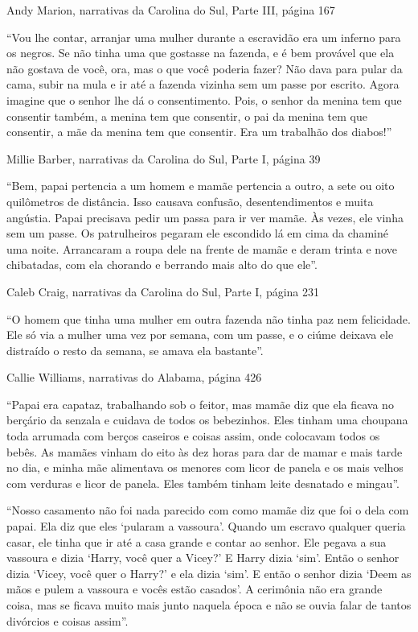 Andy Marion, narrativas da Carolina do Sul, Parte III, página 167

``Vou lhe contar, arranjar uma mulher durante a escravidão era um
inferno para os negros. Se não tinha uma que gostasse na fazenda, e é
bem provável que ela não gostava de você, ora, mas o que você poderia
fazer? Não dava para pular da cama, subir na mula e ir até a fazenda
vizinha sem um passe por escrito. Agora imagine que o senhor lhe dá o
consentimento. Pois, o senhor da menina tem que consentir também, a
menina tem que consentir, o pai da menina tem que consentir, a mãe da
menina tem que consentir. Era um trabalhão dos diabos!''

Millie Barber, narrativas da Carolina do Sul, Parte I, página 39

``Bem, papai pertencia a um homem e mamãe pertencia a outro, a sete ou
oito quilômetros de distância. Isso causava confusão, desentendimentos e
muita angústia. Papai precisava pedir um passa para ir ver mamãe. Às
vezes, ele vinha sem um passe. Os patrulheiros pegaram ele escondido lá
em cima da chaminé uma noite. Arrancaram a roupa dele na frente de mamãe
e deram trinta e nove chibatadas, com ela chorando e berrando mais alto
do que ele''.

Caleb Craig, narrativas da Carolina do Sul, Parte I, página 231

``O homem que tinha uma mulher em outra fazenda não tinha paz nem
felicidade. Ele só via a mulher uma vez por semana, com um passe, e o
ciúme deixava ele distraído o resto da semana, se amava ela bastante''.

Callie Williams, narrativas do Alabama, página 426

``Papai era capataz, trabalhando sob o feitor, mas mamãe diz que ela
ficava no berçário da senzala e cuidava de todos os bebezinhos. Eles
tinham uma choupana toda arrumada com berços caseiros e coisas assim,
onde colocavam todos os bebês. As mamães vinham do eito às dez horas
para dar de mamar e mais tarde no dia, e minha mãe alimentava os menores
com licor de panela e os mais velhos com verduras e licor de panela.
Eles também tinham leite desnatado e mingau''.

``Nosso casamento não foi nada parecido com como mamãe diz que foi o
dela com papai. Ela diz que eles `pularam a vassoura'. Quando um escravo
qualquer queria casar, ele tinha que ir até a casa grande e contar ao
senhor. Ele pegava a sua vassoura e dizia `Harry, você quer a Vicey?' E
Harry dizia `sim'. Então o senhor dizia `Vicey, você quer o Harry?' e
ela dizia `sim'. E então o senhor dizia `Deem as mãos e pulem a vassoura
e vocês estão casados'. A cerimônia não era grande coisa, mas se ficava
muito mais junto naquela época e não se ouvia falar de tantos divórcios
e coisas assim''.

